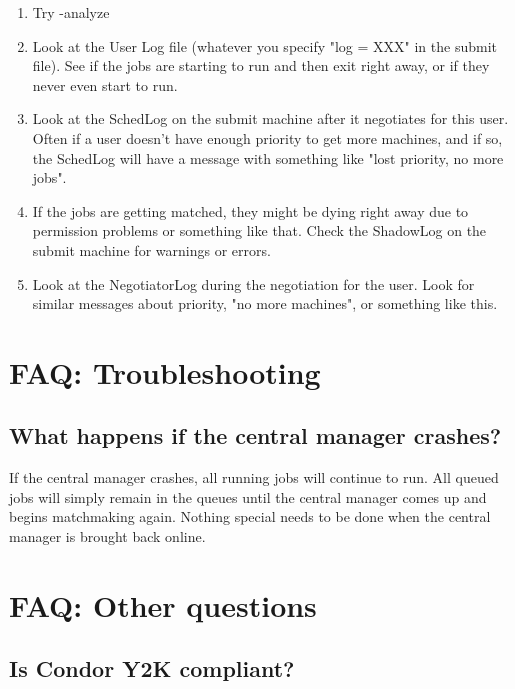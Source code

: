 \begin{enumerate}
\item Try  -analyze 

\item Look at the User Log file (whatever you specify "log = XXX" in the
submit file).  See if the jobs are starting to run and then exit right
away, or if they never even start to run.

\item Look at the SchedLog on the submit machine after it negotiates
for this user.  Often if a user doesn't have enough priority to get
more machines, and if so, the SchedLog will have a message with something
like "lost priority, no more jobs".

\item If the jobs are getting matched, they might be dying right away due
to permission problems or something like that.  Check the ShadowLog on
the submit machine for warnings or errors.

\item Look at the NegotiatorLog during the negotiation for the user.
Look for similar messages about priority, "no more machines", or
something like this.  

\end{enumerate}

\section{FAQ: Troubleshooting}


\subsection{What happens if the central manager crashes?} 

If the central manager crashes, all running jobs will continue to
run. All queued jobs will simply remain in the queues until the central
manager comes up and begins matchmaking again.  Nothing special needs
to be done when the central manager is brought back online. 


\section{FAQ: Other questions}


\subsection{Is Condor Y2K compliant?}

